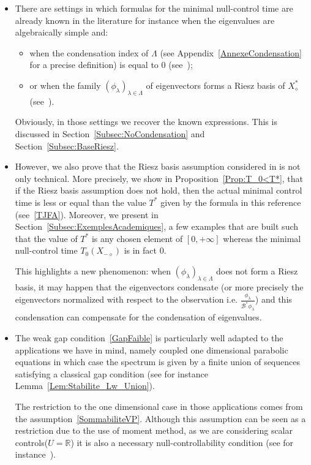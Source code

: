 \documentclass[11pt]{article}
\theoremstyle{definition}
\numberwithin{equation}{section}
\numberwithin{figure}{section}
\numberwithin{table}{section}
\newcommand\Bs{\mathcal{B}^*}
\newcommand{\Xalphas}{X_\diamond^*}
\newcommand{\Xmalpha}{X_{-\diamond}}
\newcommand{\R}{\mathbb{R}}
\begin{document}
\begin{itemize}
\item There are settings in which formulas for the minimal null-control time are already known in the literature for instance when the eigenvalues are algebraically simple and:
\begin{itemize}
\item when the condensation index of $\Lambda$ (see Appendix~\ref{AnnexeCondensation} for a precise definition) is equal to $0$ (see~\cite[Remark~1.15]{AKBGBM_2018});
\item or when the family $(\phi_\lambda)_{\lambda\in \Lambda}$ of eigenvectors forms a Riesz basis of $\Xalphas$ (see~\cite{AmmarKhodjaBenabdallahGonzalez-BurgosdeTeresa:2014}).
\end{itemize}
Obviously, in those settings we recover the known expressions. This is discussed in Section~\ref{Subsec:NoCondensation} and Section~\ref{Subsec:BaseRiesz}.
\item However, we also prove that the Riesz basis assumption considered in\linebreak \cite{AmmarKhodjaBenabdallahGonzalez-BurgosdeTeresa:2014} is not only technical. More precisely, we show in Proposition~\ref{Prop:T_0<T*}, that if the Riesz basis assumption does not hold, then the actual minimal control time is less or equal than the value $T^*$ given by the formula in this reference (see~\eqref{TJFA}). Moreover, we present in Section~\ref{Subsec:ExemplesAcademiques}, a few examples that are built such that the value of $T^*$ is any chosen element of $[0, +\infty]$ whereas the minimal null-control time $T_0(\Xmalpha)$ is in fact $0$.

This highlights a new phenomenon: when $(\phi_\lambda)_{\lambda\in \Lambda}$ does not form a Riesz basis, it may happen that the eigenvectors condensate (or more precisely the eigenvectors normalized with respect to the observation i.e. $\frac{\phi_\lambda}{\Bs \phi_\lambda}$) and this condensation can compensate for the condensation of eigenvalues.
\item The weak gap condition~\eqref{GapFaible} is particularly well adapted to the applications we have in mind, namely coupled one dimensional parabolic equations in which case the spectrum is given by a finite union of sequences satisfying a classical gap condition (see for instance Lemma~\ref{Lem:Stabilite_Lw_Union}).

The restriction to the one dimensional case in those applications comes from the assumption~\eqref{SommabiliteVP}. Although this assumption can be seen as a restriction due to the use of moment method, as we are considering scalar controls\linebreak($U=\R$) it is also a necessary null-controllability condition (see for instance~\cite[Appendix A]{Miller06}).


\end{itemize}
\end{document}
